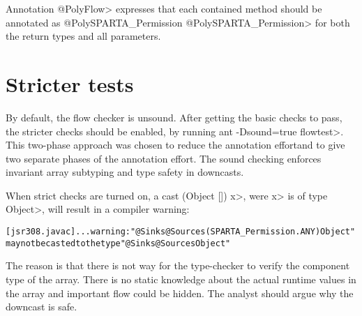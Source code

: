 Annotation \<@PolyFlow> expresses that each contained method should be
annotated as \<@PolySPARTA_Permission @PolySPARTA_Permission> for both the return
types and all parameters.



%
%
%




\section{Stricter tests\label{sec:stricter}}

By default, the flow checker is unsound.  After getting the basic checks to pass, the
 stricter checks should be enabled, by running \<ant -Dsound=true flowtest>.
This two-phase approach was chosen to reduce
the annotation effortand to give two separate phases of
the annotation effort.
 The sound checking enforces invariant 
array subtyping and type safety in downcasts.


When strict checks are turned on,
a cast \<(Object []) x>, were \<x> is of type \<Object>, will result
in a compiler warning:

\begin{alltt}
[jsr308.javac] ... warning: "@Sinks @Sources({SPARTA_Permission.ANY}) Object"
       may not be casted to the type "@Sinks @Sources Object"
\end{alltt}

The reason is that there is not way for the type-checker to verify
 the component type of the array. There is no static knowledge about the actual
runtime values in the array and important flow could be hidden.
The analyst should argue why the downcast is safe.

